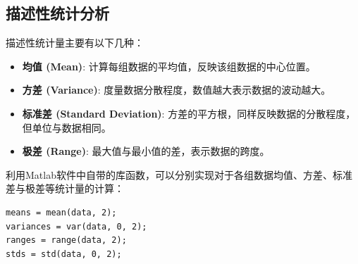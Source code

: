 \documentclass[12pt]{article}  %
\begin{document}
\subsection{描述性统计分析}
描述性统计量主要有以下几种：

\begin{itemize}
	\setlength{\parsep}{0ex} %
	\setlength{\topsep}{2ex} %
	\setlength{\itemsep}{1ex} %
	\item \textbf{均值 (Mean)}: 计算每组数据的平均值，反映该组数据的中心位置。		
	\item \textbf{方差 (Variance)}: 度量数据分散程度，数值越大表示数据的波动越大。
	\item \textbf{标准差 (Standard Deviation)}: 方差的平方根，同样反映数据的分散程度，但单位与数据相同。
	\item \textbf{极差 (Range)}: 最大值与最小值的差，表示数据的跨度。
\end{itemize}

利用Matlab软件中自带的库函数，可以分别实现对于各组数据均值、方差、标准差与极差等统计量的计算：
\begin{lstlisting}
means = mean(data, 2); 
variances = var(data, 0, 2); 
ranges = range(data, 2); 
stds = std(data, 0, 2);
\end{lstlisting}
\end{document}
